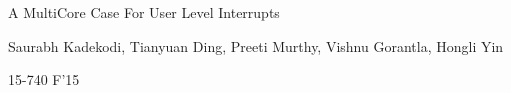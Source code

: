 \documentclass[11pt]{article}
\begin{document}
\vspace*{-5ex}\centerline{\Large A MultiCore Case For User Level Interrupts}
\vspace*{-.5ex}
\begin{center}
Saurabh Kadekodi, Tianyuan Ding, Preeti Murthy, Vishnu Gorantla, Hongli Yin

15-740 F'15
\end{center}











 

\end{document}
